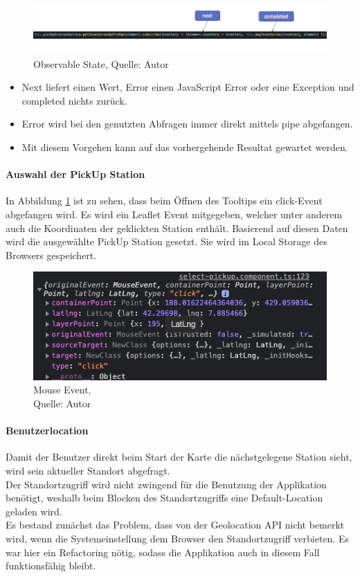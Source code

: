  \begin{figure}[H]
	\centering
	\includegraphics[width=1\textwidth]{images/observable.PNG}
	\caption[Observable States]{Observable State, Quelle: Autor}
	\label{img: observableState}
\end{figure} 
\begin{itemize}
\item Next liefert einen Wert, Error einen JavaScript Error oder eine Exception und completed nichts zurück. 
\item Error wird bei den genutzten Abfragen immer direkt mittels pipe abgefangen. \\
\item Mit diesem Vorgehen kann auf das vorhergehende Resultat gewartet werden.
\end{itemize}

\paragraph{Auswahl der PickUp Station}
In Abbildung \ref{img: observableState} ist zu sehen, dass beim Öffnen des Tooltips ein click-Event abgefangen wird. Es wird ein Leaflet Event mitgegeben, welcher unter anderem auch die Koordinaten der geklickten Station enthält. Basierend auf diesen Daten wird die ausgewählte PickUp Station gesetzt. Sie wird im Local Storage des Browsers gespeichert. 
 \begin{figure}[H]
	\centering
	\includegraphics[scale=0.5]{images/mouseEvent.PNG}
	\caption[Mouse Event]{Mouse Event,\\ Quelle: Autor}
	\label{img: MouseEvent}
\end{figure} 

\paragraph{Benutzerlocation}
Damit der Benutzer direkt beim Start der Karte die nächstgelegene Station sieht, wird sein aktueller Standort abgefragt.\\
Der Standortzugriff wird nicht zwingend für die Benutzung der Applikation benötigt, weshalb beim Blocken des Standortzugriffs eine Default-Location geladen wird. \\
Es bestand zunächst das Problem, dass von der Geolocation API nicht bemerkt wird, wenn die Systemeinstellung dem Browser den Standortzugriff verbieten. Es war hier ein Refactoring nötig, sodass die Applikation auch in diesem Fall funktionsfähig bleibt. 

